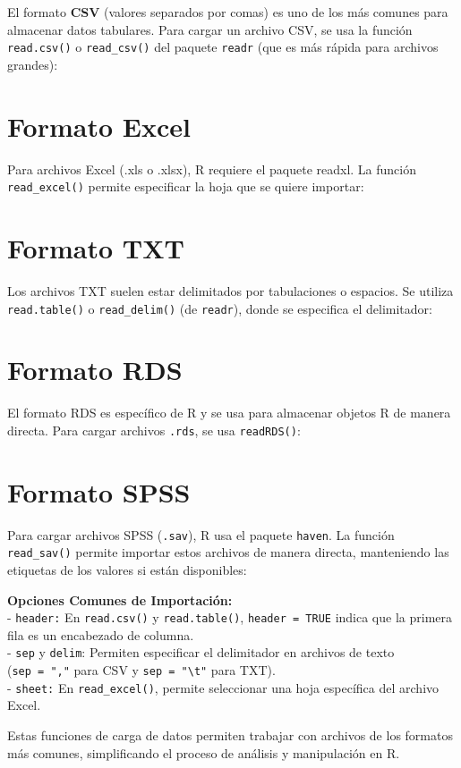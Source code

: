 \documentclass[
]{book}
\begin{document}
El formato \textbf{CSV} (valores separados por comas) es uno de los más comunes para almacenar datos tabulares. Para cargar un archivo CSV, se usa la función \texttt{read.csv()} o \texttt{read\_csv()} del paquete \texttt{readr} (que es más rápida para archivos grandes):

\section{Formato Excel}\label{formato-excel}

Para archivos Excel (.xls o .xlsx), R requiere el paquete readxl. La función \texttt{read\_excel()} permite especificar la hoja que se quiere importar:

\section{Formato TXT}\label{formato-txt}

Los archivos TXT suelen estar delimitados por tabulaciones o espacios. Se utiliza \texttt{read.table()} o \texttt{read\_delim()} (de \texttt{readr}), donde se especifica el delimitador:

\section{Formato RDS}\label{formato-rds}

El formato RDS es específico de R y se usa para almacenar objetos R de manera directa. Para cargar archivos \texttt{.rds}, se usa \texttt{readRDS()}:

\section{Formato SPSS}\label{formato-spss}

Para cargar archivos SPSS (\texttt{.sav}), R usa el paquete \texttt{haven}. La función \texttt{read\_sav()} permite importar estos archivos de manera directa, manteniendo las etiquetas de los valores si están disponibles:

\textbf{Opciones Comunes de Importación:}\\
- \texttt{header:} En \texttt{read.csv()} y \texttt{read.table()}, \texttt{header\ =\ TRUE} indica que la primera fila es un encabezado de columna.\\
- \texttt{sep} y \texttt{delim}: Permiten especificar el delimitador en archivos de texto (\texttt{sep\ =\ ","} para CSV y \texttt{sep\ =\ "\textbackslash{}t"} para TXT).\\
- \texttt{sheet:} En \texttt{read\_excel()}, permite seleccionar una hoja específica del archivo Excel.

Estas funciones de carga de datos permiten trabajar con archivos de los formatos más comunes, simplificando el proceso de análisis y manipulación en R.

  
\end{document}
